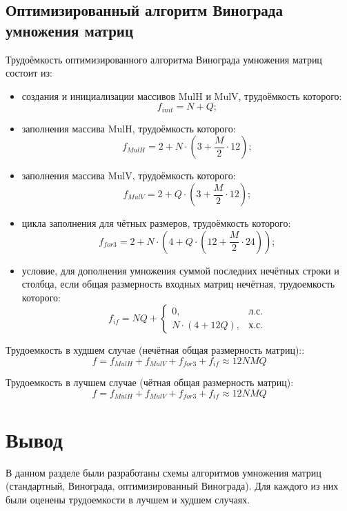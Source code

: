 \subsection{Оптимизированный алгоритм Винограда умножения матриц}

Трудоёмкость оптимизированного алгоритма Винограда умножения матриц состоит из:
\begin{itemize}
	\item создания и инициализации массивов MulH и MulV, трудоёмкость которого:
	\begin{equation}
		\label{for:impr_init}
		f_{init} = N + Q;
	\end{equation}
	
	\item заполнения массива MulH, трудоёмкость которого:
	\begin{equation}
		\label{for:impr_MulH}
		f_{MulH} = 2 + N \cdot (3 + \frac{M}{2} \cdot 12);
	\end{equation}
	
	\item заполнения массива MulV, трудоёмкость которого:
	\begin{equation}
		\label{for:impr_MulV}
		f_{MulV} = 2 + Q \cdot (3 + \frac{M}{2} \cdot 12);
	\end{equation}
	
	\item цикла заполнения для чётных размеров, трудоёмкость которого:
	\begin{equation}
		\label{for:impr_cycle}
		f_{for3} = 2 + N \cdot (4 + Q \cdot (12 + \frac{M}{2} \cdot 24));
	\end{equation}
	
	\item условие, для дополнения умножения суммой последних нечётных строки и столбца, если общая размерность входных матриц нечётная, трудоемкость которого:
	\begin{equation}
		\label{for:if}
		f_{if} = NQ +
		\begin{cases}
			0, & \text{л.с.}\\
			N \cdot (4 + 12Q), & \text{х.с.}
		\end{cases}
	\end{equation}
\end{itemize}

Трудоемкость в худшем случае (нечётная общая размерность матриц)::
\begin{equation}
	\label{for:bad_impr}
	f = f_{MulH} + f_{MulV} + f_{for3} + f_{if} \approx 12NMQ
\end{equation}

Трудоемкость в лучшем случае (чётная общая размерность матриц):
\begin{equation}
	\label{for:good_impr}
	f = f_{MulH} + f_{MulV} + f_{for3} + f_{if} \approx 12NMQ
\end{equation}

\section*{Вывод}

В данном разделе были разработаны схемы алгоритмов умножения матриц (стандартный, Винограда, оптимизированный Винограда). Для каждого из них были оценены трудоемкости в лучшем и худшем случаях.